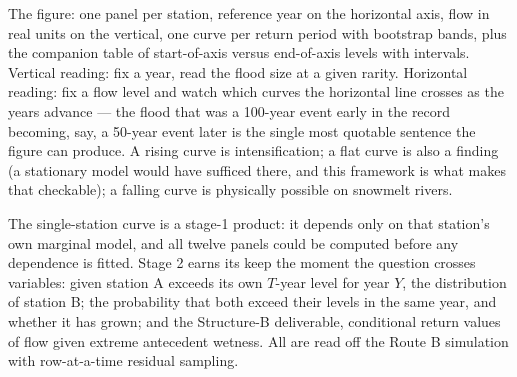 \documentclass[11pt]{article}
\begin{document}
The figure: one panel per station, reference year on the horizontal axis, flow in real units on the vertical, one curve per return period with bootstrap bands, plus the companion table of start-of-axis versus end-of-axis levels with intervals. Vertical reading: fix a year, read the flood size at a given rarity. Horizontal reading: fix a flow level and watch which curves the horizontal line crosses as the years advance --- the flood that was a 100-year event early in the record becoming, say, a 50-year event later is the single most quotable sentence the figure can produce. A rising curve is intensification; a flat curve is also a finding (a stationary model would have sufficed there, and this framework is what makes that checkable); a falling curve is physically possible on snowmelt rivers.

The single-station curve is a stage-1 product: it depends only on that station's own marginal model, and all twelve panels could be computed before any dependence is fitted. Stage 2 earns its keep the moment the question crosses variables: given station A exceeds its own $T$-year level for year $Y$, the distribution of station B; the probability that both exceed their levels in the same year, and whether it has grown; and the Structure-B deliverable, conditional return values of flow given extreme antecedent wetness. All are read off the Route B simulation with row-at-a-time residual sampling.
\end{document}
